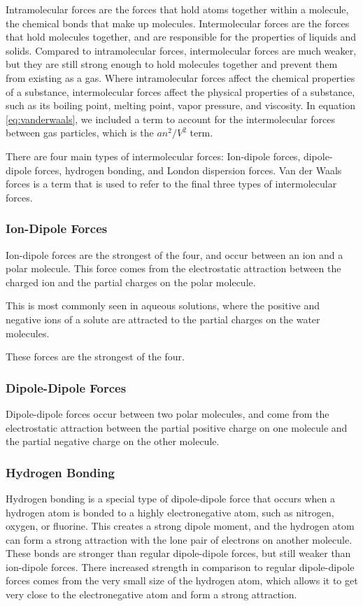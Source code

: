 Intramolecular forces are the forces that hold atoms together within a molecule, the chemical bonds that make up molecules. Intermolecular forces are the forces that hold molecules together, and are responsible for the properties of liquids and solids. Compared to intramolecular forces, intermolecular forces are much weaker, but they are still strong enough to hold molecules together and prevent them from existing as a gas. Where intramolecular forces affect the chemical properties of a substance, intermolecular forces affect the physical properties of a substance, such as its boiling point, melting point, vapor pressure, and viscosity. In equation \eqref{eq:vanderwaals}, we included a term to account for the intermolecular forces between gas particles, which is the $an^2/V^2$ term. 

There are four main types of intermolecular forces: Ion-dipole forces, dipole-dipole forces, hydrogen bonding, and London dispersion forces. Van der Waals forces is a term that is used to refer to the final three types of intermolecular forces.
\subsubsection{Ion-Dipole Forces}
Ion-dipole forces are the strongest of the four, and occur between an ion and a polar molecule. This force comes from the electrostatic attraction between the charged ion and the partial charges on the polar molecule. 

This is most commonly seen in aqueous solutions, where the positive and negative ions of a solute are attracted to the partial charges on the water molecules. 

These forces are the strongest of the four.

\subsubsection{Dipole-Dipole Forces}
Dipole-dipole forces occur between two polar molecules, and come from the electrostatic attraction between the partial positive charge on one molecule and the partial negative charge on the other molecule. 


\subsubsection{Hydrogen Bonding}
Hydrogen bonding is a special type of dipole-dipole force that occurs when a hydrogen atom is bonded to a highly electronegative atom, such as nitrogen, oxygen, or fluorine. This creates a strong dipole moment, and the hydrogen atom can form a strong attraction with the lone pair of electrons on another molecule. These bonds are stronger than regular dipole-dipole forces, but still weaker than ion-dipole forces.
There increased strength in comparison to regular dipole-dipole forces comes from the very small size of the hydrogen atom, which allows it to get very close to the electronegative atom and form a strong attraction. 

